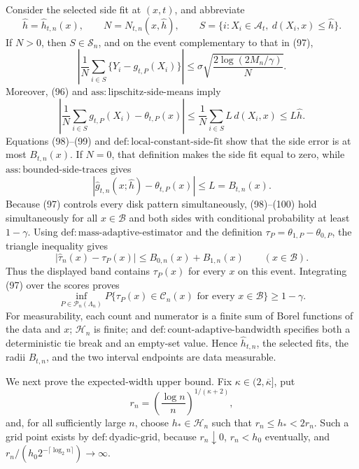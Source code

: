 Consider the selected side fit at \((x,t)\), and abbreviate
\[
 \widehat h=\widehat h_{t,n}(x),\qquad
 N=N_{t,n}(x,\widehat h),\qquad
 S=\{i:X_i\in\mathcal A_t,\ d(X_i,x)\le\widehat h\}.
\]
If \(N>0\), then \(S\in\mathscr S_n\), and on the event complementary to that in (97),
\[
 \left|\frac1N\sum_{i\in S}\{Y_i-g_{t,P}(X_i)\}\right|
 \le \sigma\sqrt{\frac{2\log(2M_n/\gamma)}{N}}. \tag{98}
\]
Moreover, (96) and \(\mathrm{ass:lipschitz\text{-}side\text{-}means}\) imply
\[
 \left|\frac1N\sum_{i\in S}g_{t,P}(X_i)-\theta_{t,P}(x)\right|
 \le \frac1N\sum_{i\in S}L\,d(X_i,x)\le L\widehat h. \tag{99}
\]
Equations (98)--(99) and \(\mathrm{def:local\text{-}constant\text{-}side\text{-}fit}\) show that the side error is at most \(B_{t,n}(x)\). If \(N=0\), that definition makes the side fit equal to zero, while \(\mathrm{ass:bounded\text{-}side\text{-}traces}\) gives
\[
 |\widehat g_{t,n}(x;\widehat h)-\theta_{t,P}(x)|\le L=B_{t,n}(x). \tag{100}
\]
Because (97) controls every disk pattern simultaneously, (98)--(100) hold simultaneously for all \(x\in\mathcal B\) and both sides with conditional probability at least \(1-\gamma\). Using \(\mathrm{def:mass\text{-}adaptive\text{-}estimator}\) and the definition \(\tau_P=\theta_{1,P}-\theta_{0,P}\), the triangle inequality gives
\[
 |\widehat\tau_n(x)-\tau_P(x)|\le B_{0,n}(x)+B_{1,n}(x)\qquad(x\in\mathcal B). \tag{101}
\]
Thus the displayed band contains \(\tau_P(x)\) for every \(x\) on this event. Integrating (97) over the scores proves
\[
 \inf_{P\in\mathcal P_n(\Lambda_n)}
 P\{\tau_P(x)\in\mathcal C_n(x)\text{ for every }x\in\mathcal B\}\ge1-\gamma. \tag{102}
\]
For measurability, each count and numerator is a finite sum of Borel functions of the data and \(x\); \(\mathcal H_n\) is finite; and \(\mathrm{def:count\text{-}adaptive\text{-}bandwidth}\) specifies both a deterministic tie break and an empty-set value. Hence \(\widehat h_{t,n}\), the selected fits, the radii \(B_{t,n}\), and the two interval endpoints are data measurable.

We next prove the expected-width upper bound. Fix \(\kappa\in(2,\overline\kappa]\), put
\[
 r_n=\left(\frac{\log n}{n}\right)^{1/(\kappa+2)}, \tag{103}
\]
and, for all sufficiently large \(n\), choose \(h_*\in\mathcal H_n\) such that \(r_n\le h_*<2r_n\). Such a grid point exists by \(\mathrm{def:dyadic\text{-}grid}\), because \(r_n\downarrow0\), \(r_n<h_0\) eventually, and \(r_n/(h_0 2^{-\lceil\log_2 n\rceil})\to\infty\).


